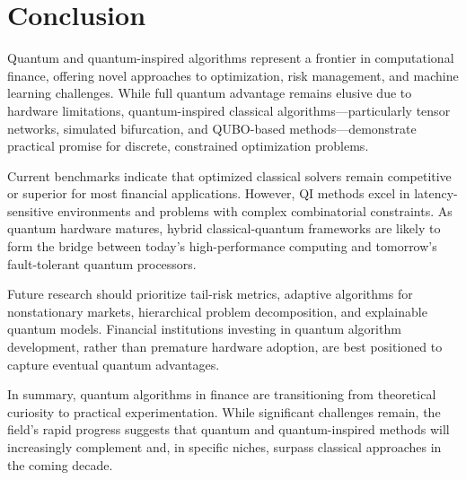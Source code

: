 \documentclass[12pt]{article}
\numberwithin{equation}{section}
\begin{document}
\section{Conclusion}

Quantum and quantum-inspired algorithms represent a frontier in computational finance, offering novel approaches to optimization, risk management, and machine learning challenges. While full quantum advantage remains elusive due to hardware limitations, quantum-inspired classical algorithms—particularly tensor networks, simulated bifurcation, and QUBO-based methods—demonstrate practical promise for discrete, constrained optimization problems.

Current benchmarks indicate that optimized classical solvers remain competitive or superior for most financial applications. However, QI methods excel in latency-sensitive environments and problems with complex combinatorial constraints. As quantum hardware matures, hybrid classical-quantum frameworks are likely to form the bridge between today's high-performance computing and tomorrow's fault-tolerant quantum processors.

Future research should prioritize tail-risk metrics, adaptive algorithms for nonstationary markets, hierarchical problem decomposition, and explainable quantum models. Financial institutions investing in quantum algorithm development, rather than premature hardware adoption, are best positioned to capture eventual quantum advantages.

In summary, quantum algorithms in finance are transitioning from theoretical curiosity to practical experimentation. While significant challenges remain, the field's rapid progress suggests that quantum and quantum-inspired methods will increasingly complement and, in specific niches, surpass classical approaches in the coming decade.



\end{document}

